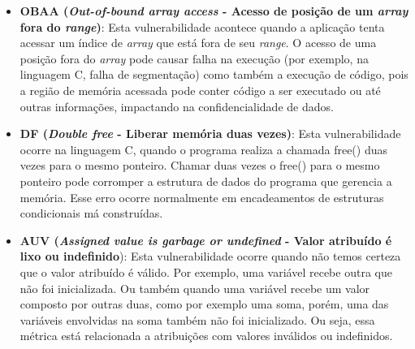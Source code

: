 \begin{itemize}
\item \textbf{OBAA (\emph{Out-of-bound array access } - Acesso de posição de um \emph{array} fora do \emph{range})}:
%
Esta vulnerabilidade acontece quando a aplicação tenta acessar um índice de \emph{array} que está fora de seu \emph{range}. O acesso de uma posição fora do \emph{array} pode causar falha na execução (por exemplo, na linguagem C, falha de segmentação) como também a execução de código, pois a região de memória acessada pode conter código a ser executado ou até outras informações, impactando na confidencialidade de dados.

\item \textbf{DF (\emph{Double free } - Liberar memória duas vezes)}:
%
Esta vulnerabilidade ocorre na linguagem C, quando o programa realiza a chamada free() duas vezes para o mesmo ponteiro. Chamar duas vezes o free() para o mesmo ponteiro pode corromper a estrutura de dados do programa que gerencia a memória. Esse erro ocorre normalmente em encadeamentos de estruturas condicionais má construídas.

\item \textbf{AUV (\emph{Assigned value is garbage or undefined} - Valor atribuído é lixo ou indefinido}):
%
Esta vulnerabilidade ocorre quando não temos certeza que o valor atribuído é válido. Por exemplo, uma variável recebe outra que não foi inicializada. Ou também quando uma variável recebe um valor composto por outras duas, como por exemplo uma soma, porém, uma das variáveis envolvidas na soma também não foi inicializado. Ou seja, essa métrica está relacionada a atribuições com valores inválidos ou indefinidos.

\end{itemize}

%


